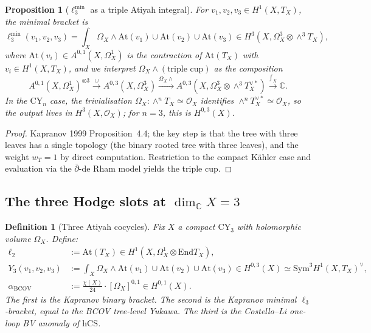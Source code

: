 \documentclass[11pt]{article}
\newtheorem{proposition}[theorem]{Proposition}
\newtheorem{definition}[theorem]{Definition}
\providecommand{\At}{\mathrm{At}}
\providecommand{\End}{\mathrm{End}}
\providecommand{\CY}{\mathrm{CY}}
\providecommand{\BCOV}{\mathrm{BCOV}}
\providecommand{\hCS}{\mathrm{hCS}}
\providecommand{\Om}{\Omega}
\providecommand{\Sym}{\mathrm{Sym}}
\providecommand{\cO}{\mathcal{O}}
\providecommand{\CC}{\mathbb{C}}
\begin{document}
\begin{proposition}[$\ell_3^{\min}$ as a triple Atiyah integral]
\label{prop:ell3-min}
For $v_1, v_2, v_3 \in H^1(X, T_X)$, the minimal bracket is
\begin{equation}
\label{eq:ell3-min}
  \ell_3^{\min}(v_1, v_2, v_3) = \int_{X} \Om_X \wedge \At(v_1) \cup
  \At(v_2) \cup \At(v_3) \in H^3(X, \Om^3_X \otimes \wedge^3 T_X),
\end{equation}
where $\At(v_i) \in A^{0,1}(X, \Om^1_X)$ is the contraction of $\At(T_X)$
with $v_i \in H^1(X, T_X)$, and we interpret $\Om_X \wedge (\text{triple
cup})$ as the composition
\[
  A^{0, 1}(X, \Om^1_X)^{\otimes 3} \xrightarrow{\cup} A^{0,3}(X, \Om^3_X)
  \xrightarrow{\Om_X \wedge} A^{0,3}(X, \Om^3_X \otimes \wedge^3 T_X^{\vee *})
  \xrightarrow{\int_X} \CC.
\]
In the $\CY_n$ case, the trivialisation $\Om_X: \wedge^n T_X \simeq \cO_X$
identifies $\wedge^n T_X^{\vee *} \simeq \cO_X$, so the output lives in
$H^3(X, \cO_X)$; for $n = 3$, this is $H^{0,3}(X)$.
\end{proposition}

\begin{proof}
Kapranov 1999 Proposition~4.4; the key step is that the tree with three
leaves has a single topology (the binary rooted tree with three leaves),
and the weight $w_T = 1$ by direct computation. Restriction to the
compact K\"ahler case and evaluation via the $\bar\partial$-de Rham model
yields the triple cup.
\end{proof}

\subsection{The three Hodge slots at $\dim_\CC X = 3$}
\label{subsec:three-hodge-slots}

\begin{definition}[Three Atiyah cocycles]
\label{def:three-cocycles}
Fix $X$ a compact $\CY_3$ with holomorphic volume $\Om_X$. Define:
\begin{align*}
  \ell_2 &:= \At(T_X) \in H^1(X, \Om^1_X \otimes \End T_X), \\
  Y_3(v_1,v_2,v_3) &:= \int_X \Om_X \wedge \At(v_1) \cup \At(v_2) \cup
    \At(v_3) \in H^{0,3}(X) \simeq \Sym^3 H^1(X, T_X)^\vee, \\
  \alpha_\BCOV &:= \frac{\chi(X)}{24} \cdot [\Om_X]^{0,1} \in H^{0,1}(X).
\end{align*}
The first is the Kapranov binary bracket. The second is the Kapranov
minimal $\ell_3$-bracket, equal to the BCOV tree-level Yukawa. The third
is the Costello--Li one-loop BV anomaly of $\hCS$.
\end{definition}
\end{document}
